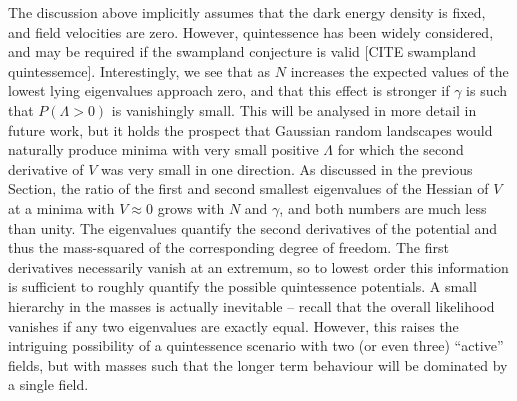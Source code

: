 \documentclass[12pt]{article}
\newcommand{\lfl}[1]{\textcolor{red}{[{\bf LL}: #1]}}
\begin{document}
The discussion above implicitly assumes that the dark energy density is fixed, and field velocities are zero. However, quintessence \cite{Tsujikawa2013} has been widely considered, and may be required if the swampland conjecture is valid [CITE swampland quintessemce]. Interestingly, we see that as $N$ increases the expected values of the lowest lying eigenvalues approach zero, and that this effect is stronger if $\gamma$ is such that $P(\Lambda>0)$ is vanishingly small. This will be analysed in more detail in future work, but it holds the prospect that Gaussian random landscapes would naturally produce minima with very small positive $\Lambda$  for which the second derivative of $V$ was very small in one direction. As discussed in the previous Section, the ratio of the first and second smallest eigenvalues of the Hessian of $V$ at a minima with $V\approx0$ grows with $N$ and $\gamma$, and both numbers are much less than unity. The eigenvalues quantify the second derivatives of the potential and thus the mass-squared of the corresponding degree of freedom. The first derivatives necessarily vanish at an extremum, so to lowest order this information is sufficient to roughly quantify the possible quintessence potentials.   A small hierarchy in the masses is actually inevitable -- recall that the overall likelihood vanishes if any two eigenvalues are exactly equal. However, this raises the intriguing possibility of a quintessence scenario with two (or even three) ``active'' fields, but with masses such that the longer term behaviour will be dominated by a single field.  

\appendix
 
%
%
\end{document}

